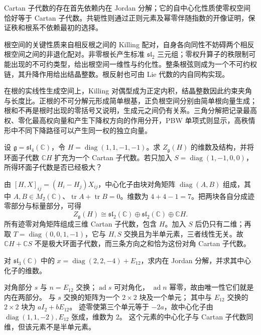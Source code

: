 \begin{chaptersummary}
	Cartan 子代数的存在首先依赖内在 Jordan 分解；它的自中心化性质使零权空间恰好等于 Cartan 子代数。共轭性则通过正则元素及幂零伴随指数的开像证明，保证秩和根系不依赖最初的选择。

	\ProseParagraphBreak

	根空间的关键性质来自相反根之间的 Killing 配对，自身各向同性不妨碍两个相反根空间之间的非退化配对。非零根长产生标准 \(\mathfrak{sl}_2\) 三元组；零权升算子的秩限制可能出现的不可约类型，给出根空间一维性与约化性。整条根弦则成为一个不可约权链，其升降作用给出结晶整数。根反射也可由 Lie 代数的内自同构实现。

	\ProseParagraphBreak

	在根的实线性生成空间上，Killing 对偶型成为正定内积，结晶整数因此约束夹角与长度比。正根的不可分解元形成简单根基，正负根空间分别由简单根向量生成；根和不再是根时出现的零括号又说明，生成元之间仍有关系。三角分解把记录最高权、零化最高权向量和产生下降权方向的作用分开，PBW 单项式则显示，高秩情形中不同下降路径可以产生同一权的独立向量。
\end{chaptersummary}

\BookExercises

\begin{exercise}\label{b5:ex:16-sl3-centralizers}
	设 \(\mathfrak g=\mathfrak{sl}_4(\mathbb C)\)，令 \(H=\operatorname{diag}(1,1,-1,-1)\)。求 \(Z_{\mathfrak g}(H)\) 的维数及结构，并将环面子代数 \(\mathbb CH\) 扩充为一个 Cartan 子代数。若只加入 \(S=\operatorname{diag}(1,-1,0,0)\)，所得环面子代数是否已经极大？
\end{exercise}
\begin{solution}
	由 \([H,X]_{ij}=(H_i-H_j)X_{ij}\)，中心化子由块对角矩阵 \(\operatorname{diag}(A,B)\) 组成，其中 \(A,B\in M_2(\mathbb C)\)、\(\operatorname{tr}A+\operatorname{tr}B=0\)。维数为 \(4+4-1=7\)。把两块各自分成迹零部分与标量部分，可得
	\[
		Z_{\mathfrak g}(H)\cong\mathfrak{sl}_2(\mathbb C)\oplus\mathfrak{sl}_2(\mathbb C)\oplus\mathbb C H.
	\]
	所有迹零对角矩阵组成三维 Cartan 子代数，包含 \(H\)。加入 \(S\) 后仍只有二维；再取 \(T=\operatorname{diag}(0,0,1,-1)\)，它与 \(H,S\) 交换且为半单元素，三者线性无关。故 \(\mathbb CH+\mathbb CS\) 不是极大环面子代数，而三条方向之和恰为这份对角 Cartan 子代数。
\end{solution}

\begin{exercise}\label{b5:ex:16-jordan-matrix}
	对 \(\mathfrak{sl}_3(\mathbb C)\) 中的 \(x=\operatorname{diag}(2,2,-4)+E_{12}\)，求内在 Jordan 分解，并求其中心化子的维数。
\end{exercise}
\begin{solution}
	对角部分 \(s\) 与 \(n=E_{12}\) 交换；\(\operatorname{ad}s\) 可对角化， \(\operatorname{ad}n\) 幂零，故由唯一性它们就是内在两部分。 与 \(s\) 交换的矩阵为一个 \(2\times2\) 块及一个单元； 其中与 \(E_{12}\) 交换的 \(2\times2\) 块为 \(aI_2+bE_{12}\)。 迹零使第三个单元等于 \(-2a\)，故中心化子由 \(\operatorname{diag}(1,1,-2),E_{12}\) 张成，维数为 \(2\)。 这个元素的中心化子与 Cartan 子代数同维，但该元素不是半单元素。
\end{solution}

